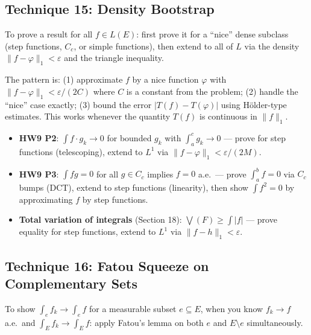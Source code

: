 \documentclass[11pt]{report}
\begin{document}
\subsection{Technique 15: Density Bootstrap}

To prove a result for all $f \in L(E)$: first prove it for a ``nice'' dense subclass (step functions, $C_c$, or simple functions), then extend to all of $L$ via the density $\|f - \varphi\|_1 < \varepsilon$ and the triangle inequality.

\begin{rembox}[Strategy]
The pattern is: (1) approximate $f$ by a nice function $\varphi$ with $\|f - \varphi\|_1 < \varepsilon/(2C)$ where $C$ is a constant from the problem; (2) handle the ``nice'' case exactly; (3) bound the error $|T(f) - T(\varphi)|$ using Hölder-type estimates. This works whenever the quantity $T(f)$ is continuous in $\|f\|_1$.
\end{rembox}

\begin{exbox}
\begin{itemize}
\item \textbf{HW9 P2}: $\int f \cdot g_k \to 0$ for bounded $g_k$ with $\int_a^c g_k \to 0$ --- prove for step functions (telescoping), extend to $L^1$ via $\|f - \varphi\|_1 < \varepsilon/(2M)$.
\item \textbf{HW9 P3}: $\int fg = 0$ for all $g \in C_c$ implies $f = 0$ a.e.\ --- prove $\int_a^b f = 0$ via $C_c$ bumps (DCT), extend to step functions (linearity), then show $\int f^2 = 0$ by approximating $f$ by step functions.
\item \textbf{Total variation of integrals} (Section 18): $\bigvee(F) \geq \int |f|$ --- prove equality for step functions, extend to $L^1$ via $\|f - h\|_1 < \varepsilon$.
\end{itemize}
\end{exbox}

\subsection{Technique 16: Fatou Squeeze on Complementary Sets}

To show $\int_e f_k \to \int_e f$ for a measurable subset $e \subseteq E$, when you know $f_k \to f$ a.e.\ and $\int_E f_k \to \int_E f$: apply Fatou's lemma on both $e$ and $E \setminus e$ simultaneously.
\end{document}
